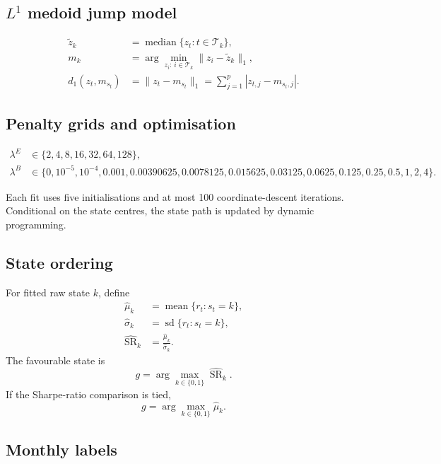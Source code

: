 \subsection{\(L^1\) medoid jump model}

\begin{align}
\widetilde{z}_k
&=
\operatorname{median}\{z_t:t\in\mathcal{T}_k\}, \\
m_k
&=
\arg\min_{z_i:\,i\in\mathcal{T}_k}
\|z_i-\widetilde{z}_k\|_1, \\
d_1(z_t,m_{s_t})
&=
\|z_t-m_{s_t}\|_1
=
\sum_{j=1}^{p}|z_{t,j}-m_{s_t,j}|.
\end{align}

\subsection{Penalty grids and optimisation}

\begin{align}
\lambda^{E}
&\in
\{2,4,8,16,32,64,128\}, \\
\lambda^{B}
&\in
\{0,10^{-5},10^{-4},0.001,0.00390625,0.0078125,0.015625,
0.03125,0.0625,0.125,0.25,0.5,1,2,4\}.
\end{align}

Each fit uses five initialisations and at most 100 coordinate-descent iterations. Conditional on the state centres, the state path is updated by dynamic programming.

\subsection{State ordering}

For fitted raw state \(k\), define
\begin{align}
\widehat{\mu}_k
&=
\operatorname{mean}\{r_t:s_t=k\}, \\
\widehat{\sigma}_k
&=
\operatorname{sd}\{r_t:s_t=k\}, \\
\widehat{\operatorname{SR}}_k
&=
\frac{\widehat{\mu}_k}{\widehat{\sigma}_k}.
\end{align}
The favourable state is
\begin{equation}
g
=
\arg\max_{k\in\{0,1\}}
\widehat{\operatorname{SR}}_k .
\end{equation}
If the Sharpe-ratio comparison is tied,
\begin{equation}
g
=
\arg\max_{k\in\{0,1\}}
\widehat{\mu}_k .
\end{equation}

\subsection{Monthly labels}

